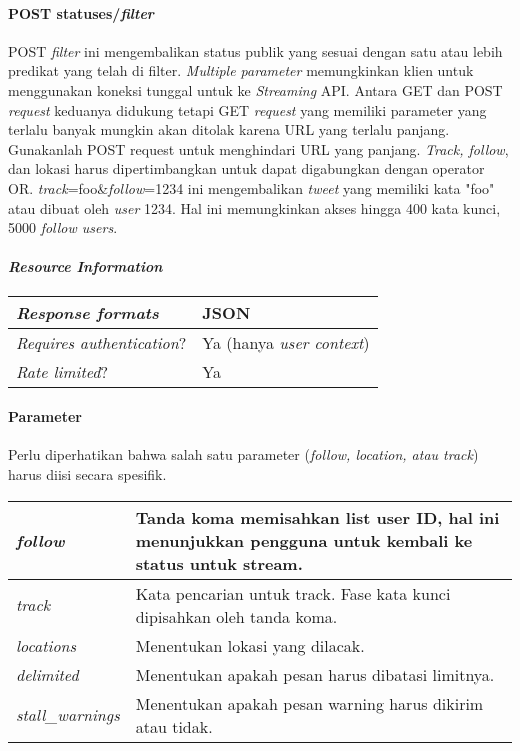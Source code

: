 \paragraph{POST statuses/\textit{filter}}
POST \textit{filter} ini mengembalikan status publik yang sesuai dengan satu atau lebih predikat yang telah di filter. \textit{Multiple parameter} memungkinkan klien untuk menggunakan koneksi tunggal untuk ke \textit{Streaming} API. Antara GET dan POST \textit{request} keduanya didukung tetapi GET \textit{request} yang memiliki parameter yang terlalu banyak mungkin akan ditolak karena URL yang terlalu panjang. Gunakanlah POST request untuk menghindari URL yang panjang.
\textit{Track, follow}, dan lokasi harus dipertimbangkan untuk dapat digabungkan dengan operator OR. \textit{track}=foo\&\textit{follow}=1234 ini mengembalikan \textit{tweet} yang memiliki kata "foo" atau dibuat oleh \textit{user} 1234.
Hal ini memungkinkan akses hingga 400 kata kunci, 5000 \textit{follow users}.

\paragraph{\textit{Resource Information}}
\begin{table}[h]
\begin{tabular}{|l|l|}
\hline
\textit{Response formats}         & JSON                    \\ \hline
\textit{Requires authentication}? & Ya (hanya \textit{user context}) \\ \hline
\textit{Rate limited}?            & Ya                    \\ \hline
\end{tabular}
\end{table}


\paragraph{Parameter}
Perlu diperhatikan bahwa salah satu parameter (\textit{follow, location, atau track}) harus diisi secara spesifik.

\begin{table}[h]
\begin{tabular}{|l|l|}
\hline
\textit{follow}          & Tanda koma memisahkan list user ID, hal ini menunjukkan pengguna untuk kembali ke status untuk stream. \\ \hline
\textit{track}           & Kata pencarian untuk track. Fase kata kunci dipisahkan oleh tanda koma.                \\ \hline
\textit{locations}       & Menentukan lokasi yang dilacak.                                                    \\ \hline
\textit{delimited}       & Menentukan apakah pesan harus dibatasi limitnya.                                         \\ \hline
\textit{stall\_warnings} & Menentukan apakah pesan warning harus dikirim atau tidak. \\ \hline                                        
\end{tabular}
\end{table}


